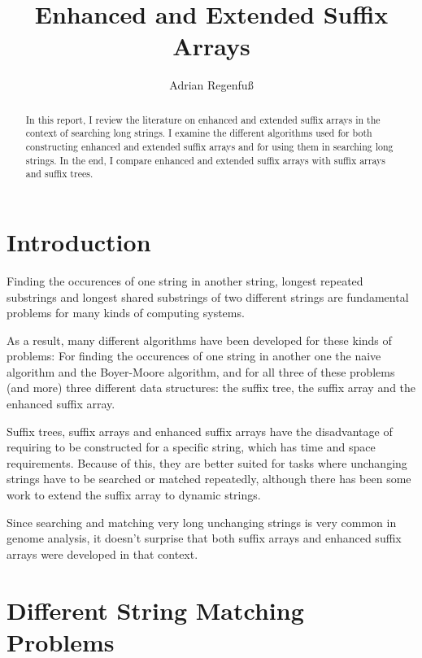 \documentclass[a4paper,10pt]{article}
\title{Enhanced and Extended Suffix Arrays}
\author{Adrian Regenfuß}
\begin{document}
\maketitle

\begin{abstract}
In this report, I review the literature on enhanced and extended suffix arrays
in the context of searching long strings. I examine the different algorithms
used for both constructing enhanced and extended suffix arrays and for using
them in searching long strings.
In the end, I compare enhanced and extended suffix arrays with suffix arrays
and suffix trees.
\end{abstract}

\section*{Introduction}

Finding the occurences of one string in another string, longest repeated
substrings and longest shared substrings of two different strings are
fundamental problems for many kinds of computing systems.

As a result, many different algorithms have been developed for these
kinds of problems: For finding the occurences of one string in another one
the naive algorithm and the Boyer-Moore algorithm, %
and for all three of these problems (and more) three different data structures:
the suffix tree, %
the suffix array \citealt{manber1993suffix} and the enhanced suffix array. %

Suffix trees, suffix arrays and enhanced suffix arrays have the
disadvantage of requiring to be constructed for a specific string,
which has time and space requirements.
Because of this, they are better suited for tasks where unchanging %
strings have to
be searched or matched repeatedly, although there has been some work to
extend the suffix array to dynamic strings. %

Since searching and matching very long unchanging strings is very common
in genome analysis, it doesn't surprise that both suffix arrays and
enhanced suffix arrays were developed in that context.

\section*{Different String Matching Problems}
\end{document}
